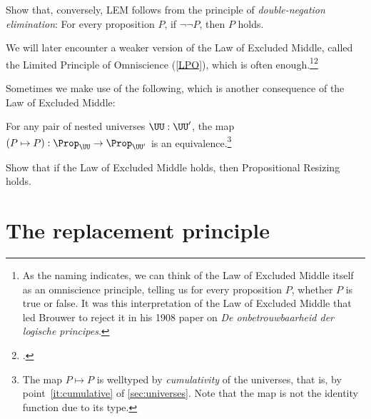 
\begin{xca}\label{xca:dne-lem}
  Show that, conversely, LEM follows from the principle of
  \emph{double-negation elimination}:
  For every proposition $P$, if $\neg \neg P$, then $P$ holds.
\end{xca}

\begin{remark}
  We will later encounter a weaker version of the Law of Excluded Middle, called the Limited
  Principle of Omniscience (\cref{LPO}), which is often enough.\footnote{%
    As the naming indicates, we can think of the Law of Excluded Middle itself as an omniscience
    principle, telling us for every proposition $P$,
    whether $P$ is true or false.
    It was this interpretation of the Law of Excluded Middle that led Brouwer to reject it
    in his 1908 paper on \emph{De onbetrouwbaarheid der logische
      principes}.\footnotemark{}}\footcitetext{Brouwer-1908}
\end{remark}

Sometimes we make use of the following,
which is another consequence of the Law of Excluded Middle:
\begin{principle}
  \label{pri:prop-resizing}
  For any pair of nested universes $\UU:\UU'$, the map
  $(P\mapsto P):\Prop_\UU \to \Prop_{\UU'}$ is an equivalence.\footnote%
  {The map $P\mapsto P$ is welltyped by \emph{cumulativity}
  of the universes, that is, by point~\ref{it:cumulative}
  of \cref{sec:universes}. Note that the map is not
  the identity function due to its type.}
\end{principle}
\begin{xca}\label{xca:lem-prop-sizing}
  Show that if the Law of Excluded Middle holds,
  then Propositional Resizing holds.
\end{xca}


\section{The replacement principle}
\label{sec:replacement}

